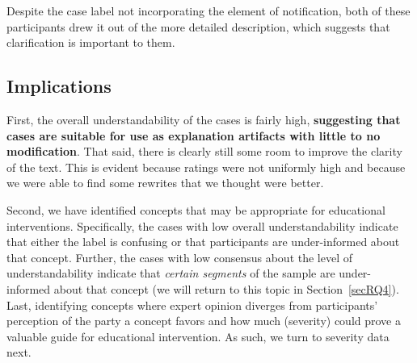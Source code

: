 Despite the case label not incorporating the element of notification, both of these participants drew it out of the more detailed description, which suggests that clarification is important to them.


\subsection{Implications}


First, the overall understandability of the cases is fairly high, \textbf{suggesting that \tosdr{} cases are suitable for use as explanation artifacts with little to no modification}.
That said, there is clearly still some room to improve the clarity of the text.
This is evident because ratings were not uniformly high and because we were able to find some rewrites that we thought were better.


Second, we have identified concepts that may be appropriate for educational interventions.
Specifically, the cases with low overall understandability indicate that either the label is confusing or that participants are under-informed about that concept.
Further, the cases with low consensus about the level of understandability indicate that \textit{certain segments} of the sample are under-informed about that concept (we will return to this topic in Section~\ref{secRQ4}).
Last, identifying concepts where expert opinion diverges from participants' perception of the party a concept favors and how much (severity) could prove a valuable guide for educational intervention.
As such, we turn to severity data next.
